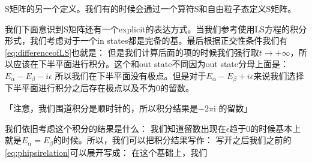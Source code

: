  S矩阵的另一个定义。我们有的时候会通过一个算符S和自由粒子态定义S矩阵。

我们下面意识到S矩阵还有一个explicit的表达方式。当我们参考使用LS方程的积分形式，我们考虑对于一个in states都是完备的基。最后根据正交性条件我们有\cref{eq:differenceofLS}也就是：
但是我们计算后面的项的时候我们强行取$ t \to +\infty $，所以应该在下半平面进行积分。这个和out state不同因为out state分母上面是：$ E_\alpha-E_\beta- i\epsilon $ 所以我们在下半平面没有极点。但是对于$ E_\alpha-E_\beta+ i\epsilon $来说我们选择下半平面进行积分之后存在极点以及不为0的留数。

「注意，我们围道积分是顺时针的，所以积分结果是$ -2 \pi \mathrm{i} $ 的留数」

我们依旧考虑这个积分的结果是什么：
我们知道留数出现在$ \epsilon $趋于0的时候基本上就是$ E_\alpha = E_\beta $的时候。所以，我们可以把积分结果写作：
写开之后我们之前的\cref{eq:phipsirelation}可以展开写成：
在这个基础上，我们



